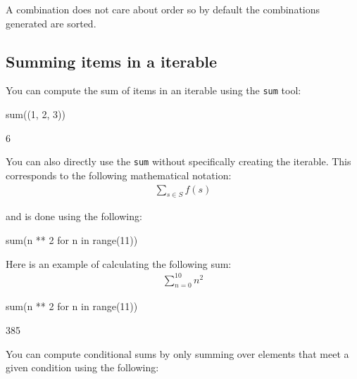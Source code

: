 A combination does not care about order so by default the combinations generated
are sorted.


\subsection{Summing items in a iterable}

You can compute the sum of items in an iterable using the \texttt{sum} tool:




\begin{pyin}
sum((1, 2, 3))
\end{pyin}





\begin{raw}
6
\end{raw}





You can also directly use the \texttt{sum} without specifically creating the
iterable. This
corresponds to the following mathematical notation:
\begin{equation*}
\begin{split}
    \sum_{s\in S}f(s)
\end{split}
\end{equation*}

and is done using the following:

\begin{pyin}
sum(n ** 2 for n in range(11))
\end{pyin}


Here is an example of calculating the following sum:
\begin{equation*}
\begin{split}
    \sum_{n=0}^{10} n ^ 2
\end{split}
\end{equation*}



\begin{pyin}
sum(n ** 2 for n in range(11))
\end{pyin}





\begin{raw}
385
\end{raw}

You can compute conditional sums by only summing over elements that
meet a given condition using the following:

